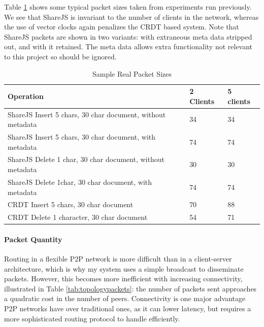 \documentclass[12pt,a4paper,twoside,openright]{report}
\begin{document}
			Table \ref{tab:samplepacketsizes} shows some typical packet sizes taken from experiments run previously. We see that ShareJS is invariant to the number of clients in the network, whereas the use of vector clocks again penalizes the CRDT based system. Note that ShareJS packets are shown in two variants: with extraneous meta data stripped out, and with it retained. The meta data allows extra functionality not relevant to this project so should be ignored.
			
			\begin{table}[htb]
			\centering
			\caption[Sample Packet Sizes]{Sample Real Packet Sizes}
			\label{tab:samplepacketsizes}
			\setlength{\tabcolsep}{12pt}
			\begin{tabular}{@{}lll@{}}
			Operation													   & 2 Clients & 5 clients \\ \toprule
			ShareJS Insert 5 chars, 30 char document, without metadata & 34        & 34        \\ \midrule
			ShareJS Insert 5 chars, 30 char document, with metadata    & 74        & 74        \\ \midrule
			ShareJS Delete 1 char, 30 char document, without metadata  & 30        & 30        \\ \midrule
			ShareJS Delete 1char, 30 char document, with metadata      & 74        & 74       \\ \midrule
			CRDT Insert 5 chars, 30 char document                      & 70        & 88        \\ \midrule
			CRDT Delete 1 character, 30 char document                  & 54        & 71        \\ \bottomrule

			\end{tabular}
			\end{table}
			
			
			
		\paragraph{Packet Quantity}
			Routing in a flexible P2P network is more difficult than in a client-server architecture, which is why my system uses a simple broadcast to disseminate packets. However, this becomes more inefficient with increasing connectivity, illustrated in Table \ref{tab:topologypackets}: the number of packets sent approaches a quadratic cost in the number of peers. Connectivity is one major advantage P2P networks have over traditional ones, as it can lower latency, but requires a more sophisticated routing protocol to handle efficiently.
			
\end{document}
